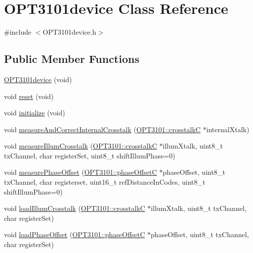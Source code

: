 \hypertarget{class_o_p_t3101device}{}\section{O\+P\+T3101device Class Reference}
\label{class_o_p_t3101device}


{\ttfamily \#include $<$O\+P\+T3101device.\+h$>$}

\subsection*{Public Member Functions}
\begin{DoxyCompactItemize}
\item 
\mbox{\hyperlink{class_o_p_t3101device_a3d4ce370caefb0970a83e01e1d5f1f90}{O\+P\+T3101device}} (void)
\item 
void \mbox{\hyperlink{class_o_p_t3101device_a2e9a97e6eddcd15a03e68f0f43012d55}{reset}} (void)
\item 
void \mbox{\hyperlink{class_o_p_t3101device_a98d04c9a5359b4d62534556e6a3db290}{initialize}} (void)
\item 
void \mbox{\hyperlink{class_o_p_t3101device_a041db5eb4a5a900ca5fff0c61ee8f7ab}{measure\+And\+Correct\+Internal\+Crosstalk}} (\mbox{\hyperlink{class_o_p_t3101_1_1crosstalk_c}{O\+P\+T3101\+::crosstalkC}} $\ast$internal\+Xtalk)
\item 
void \mbox{\hyperlink{class_o_p_t3101device_af0f08d859f6d8da0d894fa1d4ff5529b}{measure\+Illum\+Crosstalk}} (\mbox{\hyperlink{class_o_p_t3101_1_1crosstalk_c}{O\+P\+T3101\+::crosstalkC}} $\ast$illum\+Xtalk, uint8\+\_\+t tx\+Channel, char register\+Set, uint8\+\_\+t shift\+Illum\+Phase=0)
\item 
void \mbox{\hyperlink{class_o_p_t3101device_ace7558bef9a42a7103a60fb91c196e4d}{measure\+Phase\+Offset}} (\mbox{\hyperlink{class_o_p_t3101_1_1phase_offset_c}{O\+P\+T3101\+::phase\+OffsetC}} $\ast$phase\+Offset, uint8\+\_\+t tx\+Channel, char registerset, uint16\+\_\+t ref\+Distance\+In\+Codes, uint8\+\_\+t shift\+Illum\+Phase=0)
\item 
void \mbox{\hyperlink{class_o_p_t3101device_aea3e493b07770dcff587bc38c4049611}{load\+Illum\+Crosstalk}} (\mbox{\hyperlink{class_o_p_t3101_1_1crosstalk_c}{O\+P\+T3101\+::crosstalkC}} $\ast$illum\+Xtalk, uint8\+\_\+t tx\+Channel, char register\+Set)
\item 
void \mbox{\hyperlink{class_o_p_t3101device_af5b25dc0fd4829e7027e724ee16cc059}{load\+Phase\+Offset}} (\mbox{\hyperlink{class_o_p_t3101_1_1phase_offset_c}{O\+P\+T3101\+::phase\+OffsetC}} $\ast$phase\+Offset, uint8\+\_\+t tx\+Channel, char register\+Set)

\end{DoxyCompactItemize}
